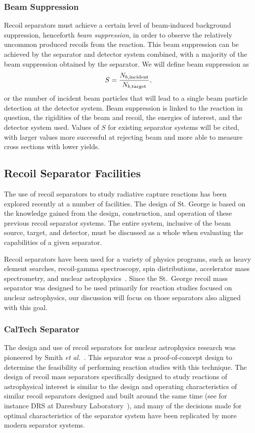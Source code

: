 \subsubsection{Beam Suppression}
Recoil separators must achieve a certain level of beam-induced
background suppression, henceforth \emph{beam suppression}, in order to
observe the relatively uncommon produced recoils from the reaction. This
beam suppression can be achieved by the separator and detector system
combined, with a majority of the beam suppression obtained by the
separator. We will define beam suppression as
\[
    S = \frac{N_{b,\rm{incident}}}{N_{b,\rm{target}}},
\]
or the number of incident beam particles that will lead to a single beam
particle detection at the detector system. Beam suppression is linked to
the reaction in question, the rigidities of the beam and recoil, the
energies of interest, and the detector system used. Values of $S$ for
existing separator systems will be cited, with larger values more
successful at rejecting beam and more able to measure cross sections
with lower yields.

\subsection{Recoil Separator Facilities}
\label{sec:prevwork}

The use of recoil separators to study radiative capture reactions has
been explored recently at a number of facilities. The design of St.
George is based on the knowledge gained from the design, construction,
and operation of these previous recoil separator systems. The entire
system, inclusive of the beam source, target, and detector, must be
discussed as a whole when evaluating the capabilities of a given
separator.

Recoil separators have been used for a variety of physics programs, such
as heavy element searches, recoil-gamma spectroscopy, spin
distributions, accelerator mass spectrometry, and nuclear
astrophysics~\cite{Davids2003}. Since the St.\ George recoil mass
separator was designed to be used primarily for reaction studies focused
on nuclear astrophysics, our discussion will focus on those separators
also aligned with this goal.

\subsubsection{CalTech Separator}
The design and use of recoil separators for nuclear astrophysics
research was pioneered by Smith \textit{et al.}~\cite{Smith1991}. This
separator was a proof-of-concept design to determine the feasibility of
performing reaction studies with this technique. The design of recoil
mass separators specifically designed to study reactions of
astrophysical interest is similar to the design and operating
characteristics of similar recoil separators designed and built around
the same time (see for instance DRS at Daresbury
Laboratory~\cite{James1988}), and many of the decisions made for optimal
characteristics of the separator system have been replicated by more
modern separator systems.

